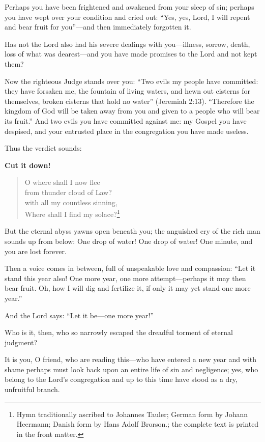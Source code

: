 Perhaps you have been frightened and awakened from your sleep of sin; perhaps you have wept over your condition and cried out: “Yes, yes, Lord, I will repent and bear fruit for you”—and then immediately forgotten it.

Has not the Lord also had his severe dealings with you—illness, sorrow, death, loss of what was dearest—and you have made promises to the Lord and not kept them?

Now the righteous Judge stands over you: “Two evils my people have committed: they have forsaken me, the fountain of living waters, and hewn out cisterns for themselves, broken cisterns that hold no water” (Jeremiah 2:13). “Therefore the kingdom of God will be taken away from you and given to a people who will bear its fruit.” And two evils you have committed against me: my Gospel you have despised, and your entrusted place in the congregation you have made useless.

Thus the verdict sounds: 

\textbf{Cut it down!}

\begin{quote}
O where shall I now flee\\
from thunder cloud of Law?\\
with all my countless sinning,\\
Where shall I find my solace?\footnote{Hymn traditionally ascribed to Johannes Tauler; German form by Johann Heermann; Danish form by Hans Adolf Brorson.; the complete text is printed in the front matter.}
\end{quote}


But the eternal abyss yawns open beneath you; the anguished cry of the rich man sounds up from below: One drop of water! One drop of water! One minute, and you are lost forever.

Then a voice comes in between, full of unspeakable love and compassion: “Let it stand this year also! One more year, one more attempt—perhaps it may then bear fruit. Oh, how I will dig and fertilize it, if only it may yet stand one more year.”

And the Lord says: “Let it be—one more year!”

Who is it, then, who so narrowly escaped the dreadful torment of eternal judgment?

It is you, O friend, who are reading this—who have entered a new year and with shame perhaps must look back upon an entire life of sin and negligence; yes, who belong to the Lord’s congregation and up to this time have stood as a dry, unfruitful branch.

